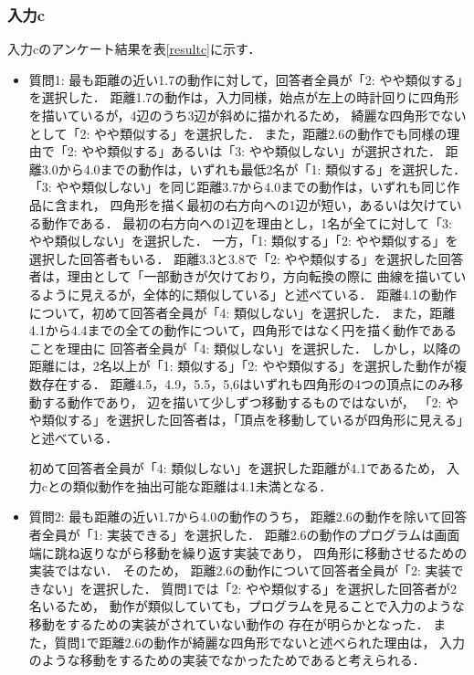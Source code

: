 \documentclass[11pt]{jreport}
\begin{document}
\subsubsection{入力c}
入力cのアンケート結果を表\ref{resultc}に示す．

\begin{itemize}
    \item 質問1: 最も距離の近い1.7の動作に対して，回答者全員が「2: やや類似する」を選択した．
    距離1.7の動作は，入力同様，始点が左上の時計回りに四角形を描いているが，4辺のうち3辺が斜めに描かれるため，
    綺麗な四角形でないとして「2: やや類似する」を選択した．
    また，距離2.6の動作でも同様の理由で「2: やや類似する」あるいは「3: やや類似しない」が選択された．
    距離3.0から4.0までの動作は，いずれも最低2名が「1: 類似する」を選択した．
    「3: やや類似しない」を同じ距離3.7から4.0までの動作は，いずれも同じ作品に含まれ，
    四角形を描く最初の右方向への1辺が短い，あるいは欠けている動作である．
    最初の右方向への1辺を理由とし，1名が全てに対して「3: やや類似しない」を選択した．
    一方，「1: 類似する」「2: やや類似する」を選択した回答者もいる．
    距離3.3と3.8で「2: やや類似する」を選択した回答者は，理由として「一部動きが欠けており，方向転換の際に
    曲線を描いているように見えるが，全体的に類似している」と述べている．
    距離4.1の動作について，初めて回答者全員が「4: 類似しない」を選択した．
    また，距離4.1から4.4までの全ての動作について，四角形ではなく円を描く動作であることを理由に
    回答者全員が「4: 類似しない」を選択した．
    しかし，以降の距離には，2名以上が「1: 類似する」「2: やや類似する」を選択した動作が複数存在する．
    距離4.5，4.9，5.5，5,6はいずれも四角形の4つの頂点にのみ移動する動作であり，
    辺を描いて少しずつ移動するものではないが，
    「2: やや類似する」を選択した回答者は，「頂点を移動しているが四角形に見える」と述べている．
    
    初めて回答者全員が「4: 類似しない」を選択した距離が4.1であるため，
    入力cとの類似動作を抽出可能な距離は4.1未満となる．
    
    \item 質問2: 最も距離の近い1.7から4.0の動作のうち，
    距離2.6の動作を除いて回答者全員が「1: 実装できる」を選択した．
    距離2.6の動作のプログラムは画面端に跳ね返りながら移動を繰り返す実装であり，
    四角形に移動させるための実装ではない．
    そのため， 距離2.6の動作について回答者全員が「2: 実装できない」を選択した．
    質問1では「2: やや類似する」を選択した回答者が2名いるため，
    動作が類似していても，プログラムを見ることで入力のような移動をするための実装がされていない動作の
    存在が明らかとなった．
    また，質問1で距離2.6の動作が綺麗な四角形でないと述べられた理由は，
    入力のような移動をするための実装でなかったためであると考えられる．
\end{itemize}
\end{document}
